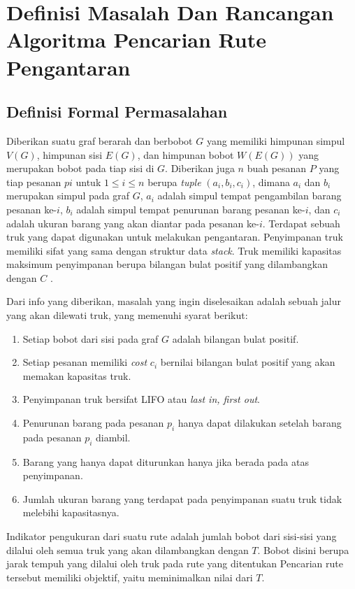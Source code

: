 \chapter{Definisi Masalah Dan Rancangan Algoritma Pencarian Rute Pengantaran}

\section{Definisi Formal Permasalahan}

Diberikan suatu graf berarah dan berbobot $G$ yang memiliki himpunan simpul $V(G)$, himpunan sisi $E(G)$, dan himpunan bobot $W(E(G))$ yang merupakan 
bobot pada tiap sisi di $G$. Diberikan juga $n$ buah pesanan $P$ yang tiap pesanan $pi$ untuk $1 \leq i \leq n$ berupa \textit{tuple} $(a_{i}, b_{i}, c_{i})$, 
dimana $a_{i}$ dan $b_{i}$ merupakan simpul pada graf $G$, $a_{i}$ adalah simpul tempat pengambilan barang pesanan ke-$i$, $b_{i}$ adalah simpul tempat penurunan 
barang pesanan ke-$i$, dan $c_{i}$ adalah ukuran barang yang akan diantar pada pesanan ke-$i$. Terdapat sebuah truk yang dapat digunakan untuk melakukan pengantaran.
Penyimpanan truk memiliki sifat yang sama dengan struktur data \textit{stack}. Truk memiliki kapasitas maksimum penyimpanan 
berupa bilangan bulat positif yang dilambangkan dengan $C$ .

Dari info yang diberikan, masalah yang ingin diselesaikan adalah sebuah jalur yang akan dilewati truk, yang memenuhi syarat berikut:
\begin{enumerate}
  \item Setiap bobot dari sisi pada graf $G$ adalah bilangan bulat positif.
  \item Setiap pesanan memiliki \textit{cost} $c_{i}$ bernilai bilangan bulat positif yang akan memakan kapasitas truk.
  \item Penyimpanan truk bersifat LIFO atau \textit{last in, first out}.
  \item Penurunan barang pada pesanan $p_{i}$ hanya dapat dilakukan setelah barang pada pesanan $p_{i}$ diambil.
  \item Barang yang hanya dapat diturunkan hanya jika berada pada atas penyimpanan.
  \item Jumlah ukuran barang yang terdapat pada penyimpanan suatu truk tidak melebihi kapasitasnya.
\end{enumerate}

Indikator pengukuran dari suatu rute adalah jumlah bobot dari sisi-sisi yang dilalui oleh semua truk yang akan dilambangkan dengan $T$. 
Bobot disini berupa jarak tempuh yang dilalui oleh truk pada rute yang ditentukan
Pencarian rute tersebut memiliki objektif, yaitu meminimalkan nilai dari $T$.

